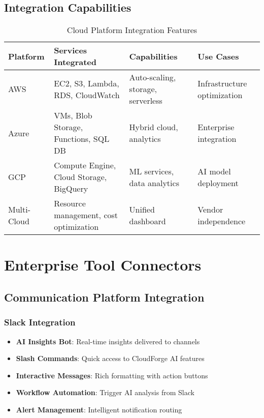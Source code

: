 \subsection{Integration Capabilities}

\begin{table}[H]
\centering
\caption{Cloud Platform Integration Features}
\begin{tabular}{|p{2cm}|p{3cm}|p{3cm}|p{4cm}|}
\hline
\textbf{Platform} & \textbf{Services Integrated} & \textbf{Capabilities} & \textbf{Use Cases} \\
\hline
AWS & EC2, S3, Lambda, RDS, CloudWatch & Auto-scaling, storage, serverless & Infrastructure optimization \\
\hline
Azure & VMs, Blob Storage, Functions, SQL DB & Hybrid cloud, analytics & Enterprise integration \\
\hline
GCP & Compute Engine, Cloud Storage, BigQuery & ML services, data analytics & AI model deployment \\
\hline
Multi-Cloud & Resource management, cost optimization & Unified dashboard & Vendor independence \\
\hline
\end{tabular}
\end{table}

\section{Enterprise Tool Connectors}

\subsection{Communication Platform Integration}

\subsubsection{Slack Integration}

\begin{itemize}
    \item \textbf{AI Insights Bot}: Real-time insights delivered to channels
    \item \textbf{Slash Commands}: Quick access to CloudForge AI features
    \item \textbf{Interactive Messages}: Rich formatting with action buttons
    \item \textbf{Workflow Automation}: Trigger AI analysis from Slack
    \item \textbf{Alert Management}: Intelligent notification routing
\end{itemize}

